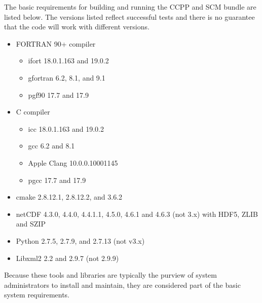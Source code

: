 The basic requirements for building and running the CCPP and SCM bundle are listed below. The versions listed reflect successful tests and there is no guarantee that the code will work with different versions.
\begin{itemize}
    \item FORTRAN 90+ compiler
    	\begin{itemize}
   	 \item ifort 18.0.1.163 and 19.0.2
	 \item gfortran 6.2, 8.1, and 9.1
	 \item pgf90 17.7 and 17.9
	 \end{itemize}
    \item C compiler
    	\begin{itemize}
	\item icc 18.0.1.163 and 19.0.2
	\item gcc 6.2 and 8.1
	\item Apple Clang 10.0.0.10001145
	\item pgcc 17.7 and 17.9
	\end{itemize}
    \item cmake 2.8.12.1, 2.8.12.2, and 3.6.2
    \item netCDF 4.3.0, 4.4.0, 4.4.1.1, 4.5.0, 4.6.1 and 4.6.3 (not 3.x) with HDF5, ZLIB and SZIP
    \item Python 2.7.5, 2.7.9, and 2.7.13 (not v3.x)
    \item Libxml2 2.2 and 2.9.7 (not 2.9.9)
\end{itemize}

Because these tools and libraries are typically the purview of system administrators to install and maintain, they are considered  part of the basic system requirements.

